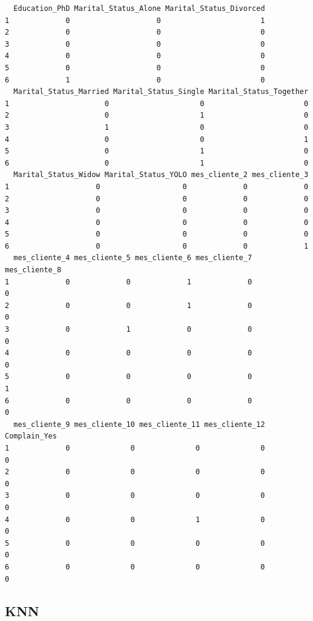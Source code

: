 \documentclass[
  letterpaper,
  DIV=11,
  numbers=noendperiod]{scrartcl}
\begin{document}
\begin{verbatim}
  Education_PhD Marital_Status_Alone Marital_Status_Divorced
1             0                    0                       1
2             0                    0                       0
3             0                    0                       0
4             0                    0                       0
5             0                    0                       0
6             1                    0                       0
  Marital_Status_Married Marital_Status_Single Marital_Status_Together
1                      0                     0                       0
2                      0                     1                       0
3                      1                     0                       0
4                      0                     0                       1
5                      0                     1                       0
6                      0                     1                       0
  Marital_Status_Widow Marital_Status_YOLO mes_cliente_2 mes_cliente_3
1                    0                   0             0             0
2                    0                   0             0             0
3                    0                   0             0             0
4                    0                   0             0             0
5                    0                   0             0             0
6                    0                   0             0             1
  mes_cliente_4 mes_cliente_5 mes_cliente_6 mes_cliente_7 mes_cliente_8
1             0             0             1             0             0
2             0             0             1             0             0
3             0             1             0             0             0
4             0             0             0             0             0
5             0             0             0             0             1
6             0             0             0             0             0
  mes_cliente_9 mes_cliente_10 mes_cliente_11 mes_cliente_12 Complain_Yes
1             0              0              0              0            0
2             0              0              0              0            0
3             0              0              0              0            0
4             0              0              1              0            0
5             0              0              0              0            0
6             0              0              0              0            0
\end{verbatim}

\subsection{KNN}\label{knn}
\end{document}
